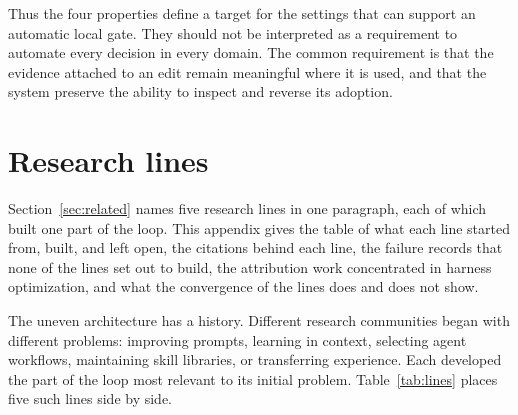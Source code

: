 Thus the four properties define a target for the settings that can support an automatic local gate. They should not be interpreted as a requirement to automate every decision in every domain. The common requirement is that the evidence attached to an edit remain meaningful where it is used, and that the system preserve the ability to inspect and reverse its adoption.

\section{Research lines}\label{app:lines}

Section~\ref{sec:related} names five research lines in one paragraph, each of which built one part of the loop. This appendix gives the table of what each line started from, built, and left open, the citations behind each line, the failure records that none of the lines set out to build, the attribution work concentrated in harness optimization, and what the convergence of the lines does and does not show.

The uneven architecture has a history. Different research communities began with different problems: improving prompts, learning in context, selecting agent workflows, maintaining skill libraries, or transferring experience. Each developed the part of the loop most relevant to its initial problem. Table~\ref{tab:lines} places five such lines side by side.

